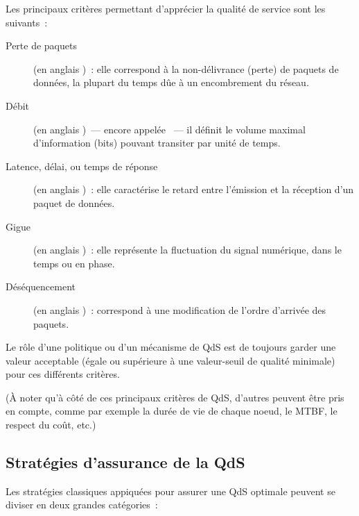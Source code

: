 Les principaux critères permettant d'apprécier la qualité de service
sont les suivants~:

\begin{description}

\item[Perte de paquets] (en anglais )~: elle
correspond à la non-délivrance (perte) de paquets de données, la plupart
du temps dûe à un encombrement du réseau.

\item[Débit] (en anglais )~--- encore appelée ~--- il définit le volume maximal d'information (bits) pouvant
transiter par unité de temps.

\item[Latence, délai, ou temps de réponse] (en anglais )~:
elle caractérise le retard entre l'émission et la réception d'un
paquet de données.

\item[Gigue] (en anglais )~: elle représente la fluctuation
du signal numérique, dans le temps ou en phase.

\item[Déséquencement] (en anglais )~: correspond à
une modification de l'ordre d'arrivée des paquets.

\end{description}

Le rôle d'une politique ou d'un mécanisme de QdS est de toujours garder
une valeur acceptable (égale ou supérieure à une valeur-seuil de
qualité minimale) pour ces différents critères.

(\`A noter qu'à côté de ces principaux critères de QdS, d'autres peuvent
être pris en compte, comme par exemple la durée de vie de chaque noeud,
le MTBF, le respect du coût, etc.)

\subsection{Stratégies d'assurance de la QdS}
\label{SubsecStratQdS}

Les stratégies classiques appiquées pour assurer une QdS optimale
peuvent se diviser en deux grandes catégories~:


